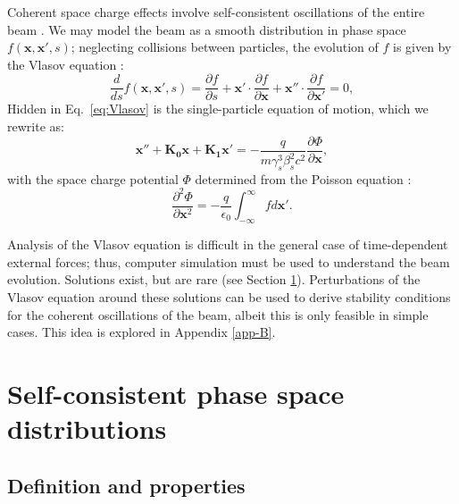 Coherent space charge effects involve self-consistent oscillations of the entire beam \cite{book:Reiser, Wangler2008, Cousineau2003}. We may model the beam as a smooth distribution in phase space $f(\mathbf{x}, \mathbf{x}', s)$; neglecting collisions between particles, the evolution of $f$ is given by the Vlasov equation \cite{Vlasov1961}:
%
\begin{equation} \label{eq:Vlasov}
    \frac{d}{ds}{f(\mathbf{x}, \mathbf{x}', s)} = 
    \frac{\partial{f}}{\partial{s}} +
    \mathbf{x}' \cdot \frac{\partial{f}}{\partial{\mathbf{x}}} +
    \mathbf{x}'' \cdot \frac{\partial{f}}{\partial{\mathbf{x'}}}
    = 0,
\end{equation}
%
Hidden in Eq.~\eqref{eq:Vlasov} is the single-particle equation of motion, which we rewrite as:
%
\begin{equation}
    \mathbf{x}'' + \mathbf{K_0} \mathbf{x} + \mathbf{K_1} \mathbf{x}'
    =
    -\frac{q}{m\gamma_s^3\beta_s^2c^2} \frac{\partial{\Phi}}{\partial\mathbf{x}},
\end{equation}
%
with the space charge potential $\Phi$ determined from the Poisson equation \cite{Jackson1975}:
%
\begin{equation} \label{eq:Poisson}
    \frac{\partial^2{\Phi}}{\partial{\mathbf{x}^2}} = -\frac{q}{\epsilon_0}
    \int_{-\infty}^{\infty}{f}d\mathbf{x}'.
\end{equation}
%

Analysis of the Vlasov equation is difficult in the general case of time-dependent external forces; thus, computer simulation must be used to understand the beam evolution. Solutions exist, but are rare (see Section \ref{sec:Self-consistent phase space distributions}). Perturbations of the Vlasov equation around these solutions can be used to derive stability conditions for the coherent oscillations of the beam, albeit this is only feasible in simple cases. This idea is explored in Appendix \ref{app-B}. 




\section{Self-consistent phase space distributions}\label{sec:Self-consistent phase space distributions}

\subsection{Definition and properties}

